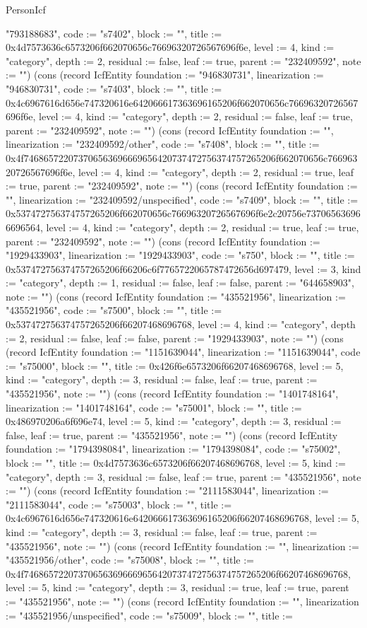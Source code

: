\begin{lexlean}{PersonIcf}
\begin{semanticmodule}
{"793188683", code := "s7402", block := "", title := 0x4d7573636c6573206f662070656c76696320726567696f6e, level := 4, kind := "category", depth := 2, residual := false, leaf := true, parent := "232409592", note := ""}) (cons (record IcfEntity {foundation := "946830731", linearization := "946830731", code := "s7403", block := "", title := 0x4c6967616d656e747320616e642066617363696165206f662070656c76696320726567696f6e, level := 4, kind := "category", depth := 2, residual := false, leaf := true, parent := "232409592", note := ""}) (cons (record IcfEntity {foundation := "", linearization := "232409592/other", code := "s7408", block := "", title := 0x4f746865722073706563696669656420737472756374757265206f662070656c76696320726567696f6e, level := 4, kind := "category", depth := 2, residual := true, leaf := true, parent := "232409592", note := ""}) (cons (record IcfEntity {foundation := "", linearization := "232409592/unspecified", code := "s7409", block := "", title := 0x537472756374757265206f662070656c76696320726567696f6e2c20756e737065636966696564, level := 4, kind := "category", depth := 2, residual := true, leaf := true, parent := "232409592", note := ""}) (cons (record IcfEntity {foundation := "1929433903", linearization := "1929433903", code := "s750", block := "", title := 0x537472756374757265206f66206c6f7765722065787472656d697479, level := 3, kind := "category", depth := 1, residual := false, leaf := false, parent := "644658903", note := ""}) (cons (record IcfEntity {foundation := "435521956", linearization := "435521956", code := "s7500", block := "", title := 0x537472756374757265206f66207468696768, level := 4, kind := "category", depth := 2, residual := false, leaf := false, parent := "1929433903", note := ""}) (cons (record IcfEntity {foundation := "1151639044", linearization := "1151639044", code := "s75000", block := "", title := 0x426f6e6573206f66207468696768, level := 5, kind := "category", depth := 3, residual := false, leaf := true, parent := "435521956", note := ""}) (cons (record IcfEntity {foundation := "1401748164", linearization := "1401748164", code := "s75001", block := "", title := 0x486970206a6f696e74, level := 5, kind := "category", depth := 3, residual := false, leaf := true, parent := "435521956", note := ""}) (cons (record IcfEntity {foundation := "1794398084", linearization := "1794398084", code := "s75002", block := "", title := 0x4d7573636c6573206f66207468696768, level := 5, kind := "category", depth := 3, residual := false, leaf := true, parent := "435521956", note := ""}) (cons (record IcfEntity {foundation := "2111583044", linearization := "2111583044", code := "s75003", block := "", title := 0x4c6967616d656e747320616e642066617363696165206f66207468696768, level := 5, kind := "category", depth := 3, residual := false, leaf := true, parent := "435521956", note := ""}) (cons (record IcfEntity {foundation := "", linearization := "435521956/other", code := "s75008", block := "", title := 0x4f746865722073706563696669656420737472756374757265206f66207468696768, level := 5, kind := "category", depth := 3, residual := true, leaf := true, parent := "435521956", note := ""}) (cons (record IcfEntity {foundation := "", linearization := "435521956/unspecified", code := "s75009", block := "", title := }
\end{semanticmodule}
\end{lexlean}
